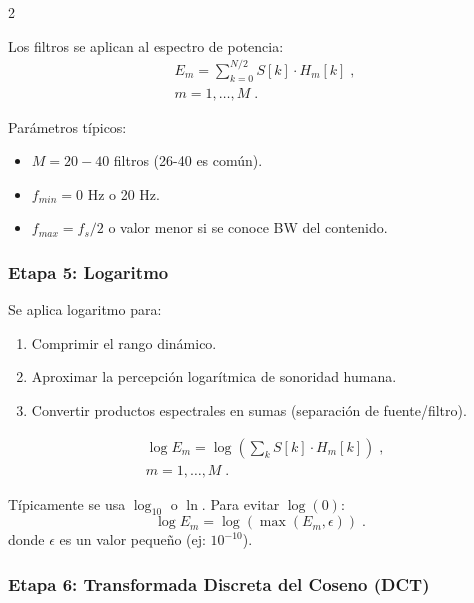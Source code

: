 \documentclass[12pt]{report}
\newenvironment{tightmulticols}{%
  \begin{multicols}{2}
  \setlength{\parskip}{1.2pt}
  \linespread{1}\selectfont
}{%
  \end{multicols}
}
\begin{document}
\begin{tightmulticols}

\noindent Los filtros se aplican al espectro de potencia:
\begin{equation*}
    \begin{split}
    &E_m = \sum_{k=0}^{N/2} S[k] \cdot H_m[k] \; , \\[0.6ex]
    &m = 1, \ldots, M \; .    
    \end{split}
\end{equation*}

\par Parámetros típicos:
\begin{itemize}
    \item $M = 20-40$ filtros (26-40 es común).
    \item $f_{min} = 0$ Hz o 20 Hz.
    \item $f_{max} = f_s/2$ o valor menor si se conoce BW del contenido.
\end{itemize}

\subsubsection{Etapa 5: Logaritmo}

\noindent Se aplica logaritmo para:
\begin{enumerate}
    \item Comprimir el rango dinámico.
    \item Aproximar la percepción logarítmica de sonoridad humana.
    \item Convertir productos espectrales en sumas (separación de fuente/filtro).
\end{enumerate}

\begin{equation*}
    \begin{split}
        &\log E_m = \log\left(\sum_{k} S[k] \cdot H_m[k]\right) \; ,  \\[0.6ex]
        &m = 1, \ldots, M \; .
    \end{split}
\end{equation*}

\par Típicamente se usa $\log_{10}$ o $\ln$. Para evitar $\log(0)$:
\begin{equation*}
   \log E_m = \log(\max(E_m, \epsilon)) \; .
\end{equation*}
\noindent donde $\epsilon$ es un valor pequeño (ej: $10^{-10}$).

\subsubsection{Etapa 6: Transformada Discreta del Coseno (DCT)}


\end{tightmulticols}
\end{document}
